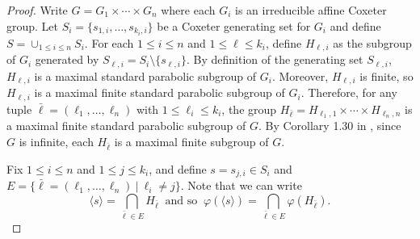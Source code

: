 \documentclass[a4paper, 11pt]{amsart}
\theoremstyle{definition}
\theoremstyle{remark}
\newtheorem{rk}[te]{Remark}
\renewcommand{\leq}{\leqslant}
\begin{document}

\begin{proof}Write $G=G_1\times \cdots\times G_n$ where each $G_i$ is an irreducible affine Coxeter group. Let $S_i=\lbrace s_{1,i},\ldots,s_{k_i,i}\rbrace$ be a Coxeter generating set for $G_i$ and define $S=\cup_{1\leq i\leq n}S_i$. For each $1\leq i\leq n$ and $1\leq \ell\leq k_i$, define $H_{\ell,i}$ as the subgroup of $G_i$ generated by $S_{\ell,i}=S_i\setminus \lbrace s_{\ell,i}\rbrace$. By definition of the generating set $S_{\ell,i}$, $H_{\ell,i}$ is a maximal standard parabolic subgroup of $G_i$. Moreover, $H_{\ell,i}$ is finite, so $H_{\ell,i}$ is a maximal finite standard parabolic subgroup of $G_i$. Therefore, for any tuple $\bar{\ell}=(\ell_1,\ldots,\ell_n)$ with $1\leq \ell_i\leq k_i$, the group $H_{\bar{\ell}}= H_{\ell_1,1}\times \cdots\times H_{\ell_n,n}$ is a maximal finite standard parabolic subgroup of $G$. By Corollary 1.30 in \cite{franz}, since $G$ is infinite, each $H_{\bar{\ell}}$ is a maximal finite subgroup of $G$.

\smallskip \noindent Fix $1\leq i\leq n$ and $1\leq j\leq k_i$, and define $s=s_{j,i}\in S_i$ and $E=\lbrace \bar{\ell}=(\ell_1,\ldots,\ell_n) \ \vert \ \ell_i\neq j\rbrace$. Note that we can write \[\langle s\rangle=\bigcap_{\bar{\ell}\in E}H_{\bar{\ell}} \ \text{ and so } \ \varphi(\langle s\rangle)=\bigcap_{\bar{\ell}\in E}\varphi(H_{\bar{\ell}}).\]


\end{proof}
\end{document}
